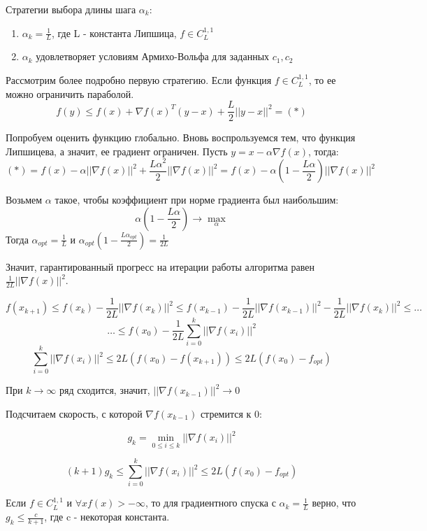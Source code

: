 \documentclass[a4paper, 12pt]{article}
\begin{document}
Стратегии выбора длины шага $\alpha_k$:

\begin{enumerate}
    \item $\alpha_k = \frac{1}{L}$, где L - константа Липшица, $f \in C^{1,1}_L$
    \item  $\alpha_k$ удовлетворяет условиям Армихо-Вольфа для заданных $c_1, c_2$
\end{enumerate}

Рассмотрим более подробно первую стратегию. Если функция $f \in C^{1,1}_L$, то ее можно ограничить параболой.
$$f(y) \leq f(x) + \nabla f(x)^T (y - x) +\frac{L}{2} ||y - x||^2 = (*) $$

Попробуем оценить функцию глобально. Вновь воспрользуемся тем, что функция Липшицева, а значит, ее градиент ограничен. Пусть $y = x - \alpha \nabla f(x)$, тогда:
$$(*) = f(x) -\alpha ||\nabla f(x)||^2 + \frac{L \alpha ^2}{2} ||\nabla f(x)||^2 = f(x) - \alpha(1-\frac{L \alpha}{2})||\nabla f(x)||^2$$

Возьмем $\alpha$ такое, чтобы коэффициент при норме градиента был наибольшим: 
$$\alpha\left(1-\frac{L \alpha}{2}\right) \rightarrow \max_{\alpha}$$
Тогда $\alpha_{opt} = \frac{1}{L}$ и $\alpha_{opt}\left(1-\frac{L \alpha_{opt}}{2}\right)  = \frac{1}{2L}$

Значит, гарантированный прогресс на итерации работы алгоритма равен $\frac{1}{2L}||\nabla f(x)||^2$. 


$$f(x_{k+1}) \leq f(x_{k}) - \frac{1}{2L}||\nabla f(x_k)||^2 \leq f(x_{k-1}) - \frac{1}{2L}||\nabla f(x_{k-1})||^2 - \frac{1}{2L}||\nabla f(x_{k})||^2 \leq \dots$$
$$\dots \leq f(x_{0}) - \frac{1}{2L}\sum_{i = 0}^{k}||\nabla f(x_i)||^2$$
$$\sum_{i = 0}^{k}||\nabla f(x_i)||^2 \leq 2L(f(x_0) - f(x_{k+1})) \leq 2L(f(x_0) - f_{opt})$$

При $ k \rightarrow \infty$ ряд сходится, значит, $||\nabla f(x_{k-1})||^2 \rightarrow 0$

Подсчитаем скорость, с которой $\nabla f(x_{k-1})$ стремится к 0:

$$g_k = \min_{0\leq i\leq k}||\nabla f(x_{i})||^2$$

$$(k+1)g_k \leq \sum_{i = 0}^{k}||\nabla f(x_i)||^2 \leq 2L(f(x_0) - f_{opt})$$

\begin{Statement}
Если $ f \in C^{1,1}_L$ и $\forall x f(x) > -\infty $, то для градиентного спуска с $\alpha_k = \frac{1}{L}$ верно, что $g_k \leq \frac{c}{k+1}$, где c - некоторая константа.
\end{Statement}
\end{document}

